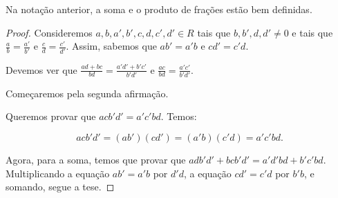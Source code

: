 \begin{lemma}
    Na notação anterior, a soma e o produto de frações estão bem definidas.
\end{lemma}
\begin{proof}
    Consideremos $a, b, a', b', c, d, c', d'\in R$ tais que $b, b', d, d'\neq 0$ e tais que $\frac{a}{b}=\frac{a'}{b'}$ e $\frac{c}{d}=\frac{c'}{d'}$.
    Assim, sabemos que $ab'=a'b$ e $cd'=c'd$.

    Devemos ver que $\frac{ad+bc}{bd}=\frac{a'd'+b'c'}{b'd'}$ e $\frac{ac}{bd}=\frac{a'c'}{b'd'}$.

    Começaremos pela segunda afirmação.
    
    Queremos provar que $acb'd'=a'c'bd$.
    Temos:

    \[acb'd'=(ab')(cd')=(a'b)(c'd)=a'c'bd.\]

    Agora, para a soma, temos que provar que $adb'd'+bcb'd'=a'd'bd+b'c'bd$.
    Multiplicando a equação $ab'=a'b$ por $d'd$, a equação $cd'=c'd$ por $b'b$, e somando, segue a tese.
\end{proof}

